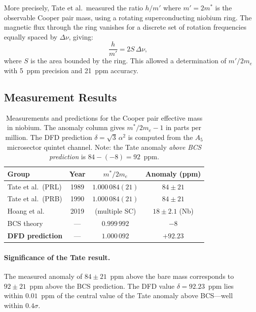 \documentclass[12pt,a4paper]{article}
\theoremstyle{definition}
\theoremstyle{remark}
\begin{document}
More precisely, Tate et al.\ measured the ratio $h/m'$ where $m' = 2m^*$ is
the observable Cooper pair mass, using a rotating superconducting niobium ring.
The magnetic flux through the ring vanishes for a discrete set of rotation
frequencies equally spaced by $\Delta\nu$, giving:
\begin{equation}
\frac{h}{m'} = 2S\,\Delta\nu,
\end{equation}
where $S$ is the area bounded by the ring.  This allowed a determination of
$m'/2m_e$ with 5~ppm precision and 21~ppm accuracy.

\subsection{Measurement Results}

\begin{table}[h]
\centering
\renewcommand{\arraystretch}{1.4}
\begin{tabular}{lccc}
\toprule
\textbf{Group} & \textbf{Year} & \textbf{$m^*/2m_e$} & \textbf{Anomaly (ppm)} \\
\midrule
Tate et al.\ (PRL) & 1989 & $1.000\,084(21)$ & $84 \pm 21$ \\
Tate et al.\ (PRB) & 1990 & $1.000\,084(21)$ & $84 \pm 21$ \\
Hoang et al. & 2019 & (multiple SC) & $18 \pm 2.1$ (Nb) \\
\midrule
BCS theory & --- & $0.999\,992$ & $-8$ \\
\textbf{DFD prediction} & --- & $1.000\,092$ & $\mathbf{+92.23}$ \\
\bottomrule
\end{tabular}
\caption{Measurements and predictions for the Cooper pair effective mass in niobium.
The anomaly column gives $m^*/2m_e - 1$ in parts per million.  The DFD prediction
$\delta = \sqrt{3}\,\alpha^2$ is computed from the $A_5$ microsector quintet channel.
Note: the Tate anomaly \emph{above BCS prediction} is $84 - (-8) = 92$~ppm.}
\label{tab:measurements}
\end{table}

\paragraph{Significance of the Tate result.}
The measured anomaly of $84 \pm 21$~ppm above the bare mass corresponds to
$92 \pm 21$~ppm above the BCS prediction.  The DFD value $\delta = 92.23$~ppm
lies within $0.01$~ppm of the central value of the Tate anomaly above BCS---well
within $0.4\sigma$.
\end{document}
